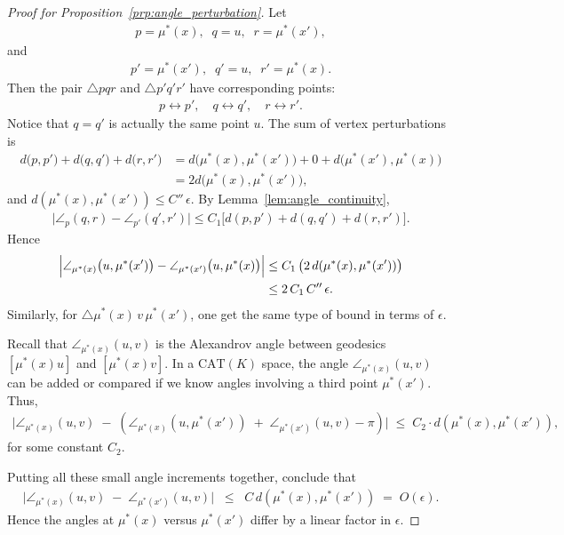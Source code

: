 \begin{proof}[Proof for Proposition~\ref{prp:angle_perturbation}]
    Let
    \begin{align*}
        p = \mu^*(x),\;\; q = u,\;\; r = \mu^*(x'),        
    \end{align*}
    and
    \begin{align*}
        p' = \mu^*(x'),\;\; q' = u,\;\; r' = \mu^*(x).
    \end{align*}
    Then the pair \(\triangle pqr\) and \(\triangle p'q'r'\) have corresponding points:
    \begin{align*}
        p \leftrightarrow p', \quad q \leftrightarrow q',\quad r \leftrightarrow r'.
    \end{align*}
    Notice that \(q=q'\) is actually the same point \(u\).  
    The sum of vertex perturbations is
    \begin{align*}
        d\bigl(p,p'\bigr) + d\bigl(q,q'\bigr) + d\bigl(r,r'\bigr) &= d\bigl(\mu^*(x),\mu^*(x')\bigr) + 0 + d\bigl(\mu^*(x'),\mu^*(x)\bigr) \\
          &= 2 d\bigl(\mu^*(x),\mu^*(x')\bigr),
    \end{align*}
    and \(d(\mu^*(x),\mu^*(x'))\le C''\,\epsilon\).  
    By Lemma~\ref{lem:angle_continuity},
    \begin{align*}
        \bigl|\angle_p(q,r) - \angle_{p'}(q',r')\bigr| \leq C_1 \bigl[d(p,p') + d(q,q') + d(r,r')\bigr].
    \end{align*}
    Hence
    \begin{align*}
        \Bigl|\angle_{\mu^*(x)}\bigl(u,\mu^*(x')\bigr) - \angle_{\mu^*(x')}\bigl(u,\mu^*(x)\bigr) \Bigr| &\leq  C_1\,\bigl(2\,d(\mu^*(x),\mu^*(x'))\bigr) \\
        &\leq 
        2\,C_1\,C''\,\epsilon.
    \end{align*}
    Similarly, for \(\triangle \mu^*(x)\,v\,\mu^*(x')\), one get the same type of bound in terms of \(\epsilon\). 

    Recall that \(\angle_{\mu^*(x)}(u,v)\) is the Alexandrov angle between geodesics \([\mu^*(x)u]\) and \([\mu^*(x)v]\).
    In a \(\mathrm{CAT}(K)\) space, the angle \(\angle_{\mu^*(x)}(u,v)\) can be added or compared if we know angles involving a third point \(\mu^*(x')\). 
    Thus, 
    \begin{align*}
        \bigl|\angle_{\mu^*(x)}(u,v)
        \;-\;
        (\angle_{\mu^*(x)}(u,\mu^*(x')) \;+\; \angle_{\mu^*(x')}(u,v) - \pi)\bigr|
        \;\le\;
        C_2\cdot d(\mu^*(x),\mu^*(x')),
    \end{align*}
    for some constant \(C_2\).

    Putting all these small angle increments together, conclude that
    \begin{align*}
        \bigl|\angle_{\mu^*(x)}(u,v) 
        \;-\;
        \angle_{\mu^*(x')}(u,v)\bigr|
        \;\;\le\;\;
        C\,d(\mu^*(x),\mu^*(x'))
        \;=\;
        O(\epsilon).
    \end{align*}
    Hence the angles at \(\mu^*(x)\) versus \(\mu^*(x')\) differ by a linear factor in \(\epsilon\). 
\end{proof}

